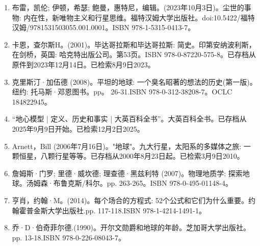\begin{enumerate}
\item 布雷，凯伦; 伊顿，希瑟; 鲍曼，惠特尼，编辑。(2023年10月3日)。尘世的事物: 内在性，新唯物主义和行星思维。福特汉姆大学出版社。doi:10.5422/福特汉姆/9781531503055.001.0001。ISBN 978-1-5315-0413-7。
\item 卡恩，查尔斯H。(2001)。毕达哥拉斯和毕达哥拉斯: 简史。印第安纳波利斯，在剑桥，英国: 哈克特出版公司。第53页。ISBN 978-0-87220-575-8。已存档从原件到2023年12月14日。已检索8月9日2023。
\item 克里斯汀·加伍德 (2008)。平坦的地球: 一个臭名昭著的想法的历史(第一版)。纽约: 托马斯·邓恩图书。pp。 26-31.ISBN 978-0-312-38208-7。OCLC 184822945。
\item “地心模型 | 定义、历史和事实 | 大英百科全书”。大英百科全书。已存档从2025年9月9日开始。已检索12月2日2025。
\item Arnett，Bill (2006年7月16日)。"地球"。九大行星，太阳系的多媒体之旅: 一颗恒星，八颗行星等等。已存档从2000年8月23日起。已检索3月9日2010。
\item 詹姆斯·门罗; 里德·威坎德; 理查德·黑兹利特 (2007)。物理地质学: 探索地球。汤姆森·布鲁克斯/科尔。pp. 263-265。ISBN 978-0-495-01148-4。
\item 亨肖，约翰·M。(2014)。每个场合的方程式: 52个公式和它们为什么重要。约翰霍普金斯大学出版社.pp. 117-118.ISBN 978-1-4214-1491-1。
\item 乔·D·伯奇菲尔德.(1990)。开尔文勋爵和地球的年龄。芝加哥大学出版社。pp. 13-18.ISBN 978-0-226-08043-7。
\end{enumerate}